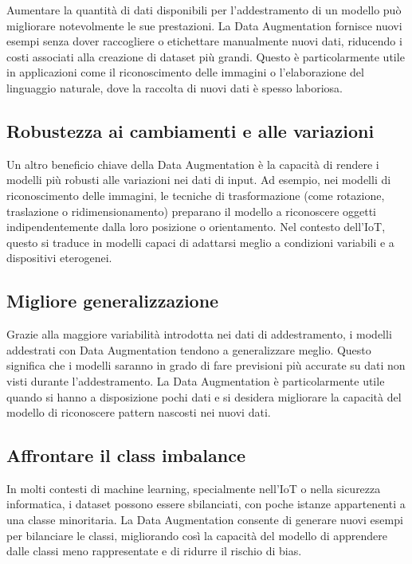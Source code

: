 Aumentare la quantità di dati disponibili per l'addestramento di un modello può migliorare notevolmente le sue prestazioni. La Data Augmentation fornisce nuovi esempi senza dover raccogliere o etichettare manualmente nuovi dati, riducendo i costi associati alla creazione di dataset più grandi. Questo è particolarmente utile in applicazioni come il riconoscimento delle immagini o l'elaborazione del linguaggio naturale, dove la raccolta di nuovi dati è spesso laboriosa.

\subsection{Robustezza ai cambiamenti e alle variazioni}

Un altro beneficio chiave della Data Augmentation è la capacità di rendere i modelli più robusti alle variazioni nei dati di input. Ad esempio, nei modelli di riconoscimento delle immagini, le tecniche di trasformazione (come rotazione, traslazione o ridimensionamento) preparano il modello a riconoscere oggetti indipendentemente dalla loro posizione o orientamento. Nel contesto dell'IoT, questo si traduce in modelli capaci di adattarsi meglio a condizioni variabili e a dispositivi eterogenei.

\subsection{Migliore generalizzazione}

Grazie alla maggiore variabilità introdotta nei dati di addestramento, i modelli addestrati con Data Augmentation tendono a generalizzare meglio. Questo significa che i modelli saranno in grado di fare previsioni più accurate su dati non visti durante l'addestramento. La Data Augmentation è particolarmente utile quando si hanno a disposizione pochi dati e si desidera migliorare la capacità del modello di riconoscere pattern nascosti nei nuovi dati.

\subsection{Affrontare il class imbalance}

In molti contesti di machine learning, specialmente nell'IoT o nella sicurezza informatica, i dataset possono essere sbilanciati, con poche istanze appartenenti a una classe minoritaria. La Data Augmentation consente di generare nuovi esempi per bilanciare le classi, migliorando così la capacità del modello di apprendere dalle classi meno rappresentate e di ridurre il rischio di bias.

